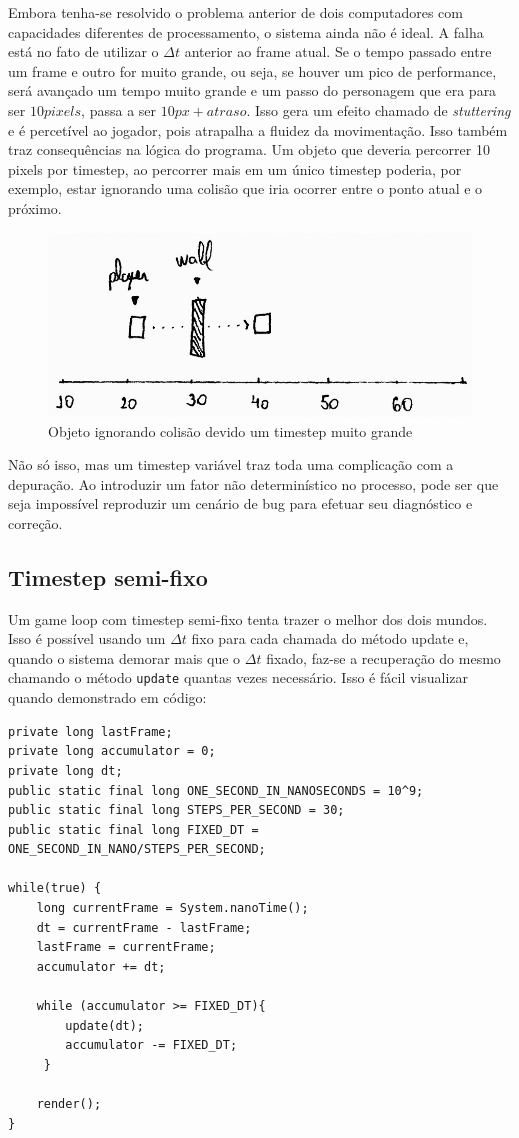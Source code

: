 \documentclass[12pt, 
openright, 
oneside, 
a4paper,    
brazil]{facom-ufu-abntex2}
\begin{document}
Embora tenha-se resolvido o problema anterior de dois computadores com capacidades diferentes de processamento, o sistema ainda não é ideal. A falha está no fato de utilizar o $\Delta t$ anterior ao frame atual. Se o tempo passado entre um frame e outro for muito grande, ou seja, se houver um pico de performance, será avançado um tempo muito grande e um passo do personagem que era para ser $10 pixels$, passa a ser $10px + atraso$. Isso gera um efeito chamado de \textit{stuttering} e é percetível ao jogador, pois atrapalha a fluidez da movimentação. Isso também traz consequências na lógica do programa. Um objeto que deveria percorrer 10 pixels por timestep, ao percorrer mais em um único timestep poderia, por exemplo, estar ignorando uma colisão que iria ocorrer entre o ponto atual e o próximo.
\begin{figure}[H]
	\centering
	\includegraphics[width=\textwidth]{imagens/ilu4_small.png}
	\caption{Objeto ignorando colisão devido um timestep muito grande}
\end{figure}
 Não só isso, mas um timestep variável traz toda uma complicação com a depuração. Ao introduzir um fator não determinístico no processo, pode ser que seja impossível reproduzir um cenário de bug para efetuar seu diagnóstico e correção. 

\subsection{Timestep semi-fixo}
Um game loop com timestep semi-fixo tenta trazer o melhor dos dois mundos. Isso é possível usando um $\Delta t$ fixo para cada chamada do método update e, quando o sistema demorar mais que o $\Delta t$ fixado, faz-se a recuperação do mesmo chamando o método \texttt{update} quantas vezes necessário.
Isso é fácil visualizar quando demonstrado em código:

\begin{lstlisting}[caption={Game Loop com timestep semi-fixo}]
private long lastFrame;
private long accumulator = 0;
private long dt;
public static final long ONE_SECOND_IN_NANOSECONDS = 10^9;
public static final long STEPS_PER_SECOND = 30;
public static final long FIXED_DT = ONE_SECOND_IN_NANO/STEPS_PER_SECOND;
			
while(true) {
	long currentFrame = System.nanoTime(); 
	dt = currentFrame - lastFrame;
	lastFrame = currentFrame;
	accumulator += dt;
	
	while (accumulator >= FIXED_DT){
    	update(dt);
    	accumulator -= FIXED_DT;
 	 }
 			 
	render();
}
\end{lstlisting}
\end{document}
